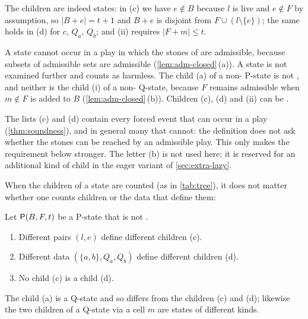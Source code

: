 The children are indeed states: in \textup{(c)} we have
$e\notin B$ because $l$ is live and $e\notin F$ by assumption, so $|B+e|=t+1$ and $B+e$ is disjoint from
$F\cup(l\setminus\{e\})$; the same holds in \textup{(d)} for $c$, $Q_a$, $Q_b$; and \textup{(ii)} requires
$|F+m|\le t$.

A \VOID{} state cannot occur in a play in which the stones of \Maker{} are admissible, because subsets of
admissible sets are admissible (\cref{lem:adm-closed}\,(a)). A \VOID{} state is not examined further and
counts as harmless. The child \textup{(a)} of a non-\VOID{} P-state is not \VOID, and neither is the child
\textup{(i)} of a non-\VOID{} Q-state, because $F$ remains admissible when $m\notin F$ is added to $B$
(\cref{lem:adm-closed}\,(b)). Children \textup{(c)}, \textup{(d)} and \textup{(ii)} can be \VOID.

The lists \textup{(c)} and \textup{(d)} contain every forced event that can occur in a play
(\cref{thm:soundness}), and in general many that cannot: the definition does not ask whether the
stones can be reached by an admissible play. This only makes the requirement \WON{} below stronger. The
letter \textup{(b)} is not used here; it is reserved for an additional kind of child in the eager variant of
\cref{sec:extra-lazy}.

When the children of a state are counted (as in \cref{tab:tree}), it does not matter whether one counts
children or the data that define them:

\begin{lemma}\label{lem:children-distinct}
Let $\mathsf{P}(B,F,t)$ be a P-state that is not \VOID.
\begin{enumerate}[label=\textup{(\alph*)},leftmargin=2.4em]
\item Different pairs $(l,e)$ define different children \textup{(c)}.
\item Different data $(\{a,b\},Q_a,Q_b)$ define different children \textup{(d)}.
\item No child \textup{(c)} is a child \textup{(d)}.
\end{enumerate}
The child \textup{(a)} is a Q-state and so differs from the children \textup{(c)} and \textup{(d)}; likewise
the two children of a Q-state via a cell $m$ are states of different kinds.
\end{lemma}

